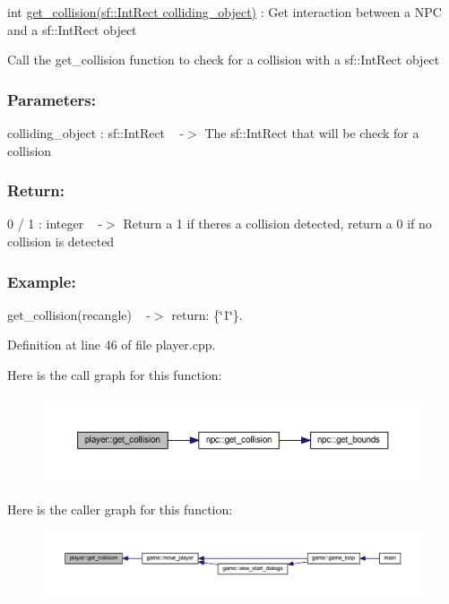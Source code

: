 int \hyperlink{classplayer_aa405bc495c5a6bced7740352abd4249f}{get\+\_\+collision(sf\+::\+Int\+Rect colliding\+\_\+object)} \+: Get interaction between a N\+PC and a sf\+::\+Int\+Rect object 

Call the \textquotesingle{}get\+\_\+collision\textquotesingle{} function to check for a collision with a sf\+::\+Int\+Rect object

\subsubsection*{Parameters\+: }

colliding\+\_\+object \+: sf\+::\+Int\+Rect ~\newline
-\/$>$ The sf\+::\+Int\+Rect that will be check for a collision

\subsubsection*{Return\+: }

0 / 1 \+: integer ~\newline
-\/$>$ Return a 1 if there\textquotesingle{}s a collision detected, return a 0 if no collision is detected

\subsubsection*{Example\+: }

get\+\_\+collision(recangle) ~\newline
-\/$>$ return\+: \{\char`\"{}1\char`\"{}\}. 

Definition at line 46 of file player.\+cpp.

Here is the call graph for this function\+:
\nopagebreak
\begin{figure}[H]
\begin{center}
\leavevmode
\includegraphics[width=350pt]{classplayer_aa405bc495c5a6bced7740352abd4249f_cgraph}
\end{center}
\end{figure}
Here is the caller graph for this function\+:
\nopagebreak
\begin{figure}[H]
\begin{center}
\leavevmode
\includegraphics[width=350pt]{classplayer_aa405bc495c5a6bced7740352abd4249f_icgraph}
\end{center}
\end{figure}
\mbox{\label{classplayer_afc7732284851b7f0d90b66a5d25931e2}} 
